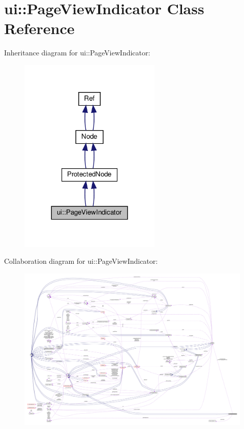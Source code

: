 \hypertarget{classui_1_1PageViewIndicator}{}\section{ui\+:\+:Page\+View\+Indicator Class Reference}
\label{classui_1_1PageViewIndicator}


Inheritance diagram for ui\+:\+:Page\+View\+Indicator\+:
\nopagebreak
\begin{figure}[H]
\begin{center}
\leavevmode
\includegraphics[width=192pt]{classui_1_1PageViewIndicator__inherit__graph}
\end{center}
\end{figure}


Collaboration diagram for ui\+:\+:Page\+View\+Indicator\+:
\nopagebreak
\begin{figure}[H]
\begin{center}
\leavevmode
\includegraphics[width=350pt]{classui_1_1PageViewIndicator__coll__graph}
\end{center}
\end{figure}
